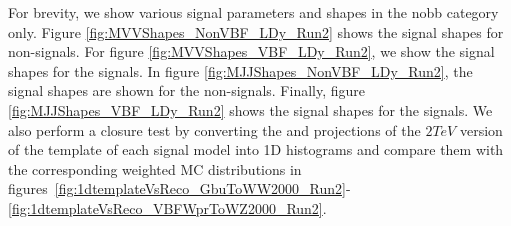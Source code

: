 For brevity, we show various signal parameters and shapes in the nobb category only.
Figure \ref{fig:MVVShapes_NonVBF_LDy_Run2} shows the \MVV signal shapes for non-\VBF signals.
For figure \ref{fig:MVVShapes_VBF_LDy_Run2}, we show the \MVV signal shapes for the \VBF signals.
In figure \ref{fig:MJJShapes_NonVBF_LDy_Run2}, the \MJ signal shapes are shown for the non-\VBF signals.
Finally, figure \ref{fig:MJJShapes_VBF_LDy_Run2} shows the \MJ signal shapes for the \VBF signals.
We also perform a closure test by converting the \MVV and \MJ projections of the $2\unit{TeV}$ version of the template of each signal model into 1D histograms and compare them with the corresponding weighted MC distributions in figures~\ref{fig:1dtemplateVsReco_GbuToWW2000_Run2}-\ref{fig:1dtemplateVsReco_VBFWprToWZ2000_Run2}.

